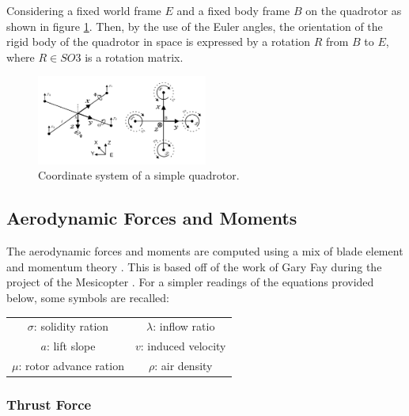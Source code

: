\documentclass{thesisreport}
\begin{document}
Considering a fixed world frame $E$ and a fixed body frame $B$ on the quadrotor as shown in figure \ref{coordinate_system_detailed_quadrotor}. Then, by the use of the Euler angles, the orientation of the rigid body of the quadrotor in space is expressed by a rotation $R$ from $B$ to $E$, where $R \in SO3$ is a rotation matrix. 
 
 \begin{figure}[h]
\centering
\includegraphics[width=0.5\textwidth]{Images/Modeling/Detailed_quadrotor}
\caption{Coordinate system of a simple quadrotor. \cite{Bouabdalla2007}}
\label{coordinate_system_detailed_quadrotor}
\end{figure}
 
\newpage

\subsection{Aerodynamic Forces and Moments}

The aerodynamic forces and moments are computed using a mix of blade element and momentum theory \cite{Leishmana}. This is based off of the work of Gary Fay during the project of the Mesicopter \cite{Leishmanb}. For a simpler readings of the equations provided below, some symbols are recalled:

\begin{table}[h]
\centering
\setlength{\tabcolsep}{10pt} %
\renewcommand{\arraystretch}{1} %
\begin{tabular}{c c}
$\sigma$: solidity ration & $\lambda$: inflow ratio \\
$a$: lift slope & $v$: induced velocity \\
$\mu$: rotor advance ration & $\rho$: air density

\end{tabular}
\captionsetup[table]{list=no}
\end{table}
 
\subsubsection*{Thrust Force}
\end{document}
